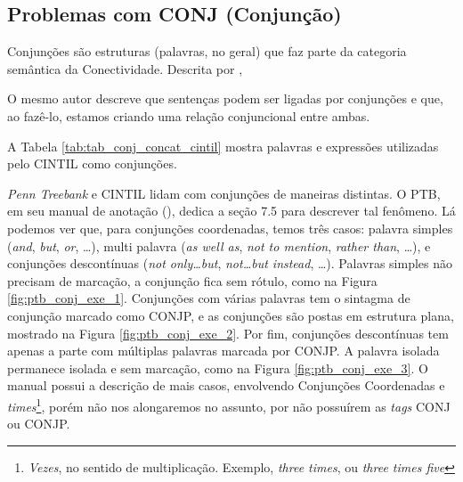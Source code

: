 \subsection{Problemas com CONJ (Conjunção)}
\label{subsec-cintil-conj}
Conjunções são estruturas (palavras, no geral) que faz parte da categoria semântica da Conectividade. Descrita por ,
\begin{displayquote}
\end{displayquote}
O mesmo autor descreve que sentenças podem ser ligadas por conjunções e que, ao fazê-lo, estamos criando uma relação conjuncional entre ambas. 
\begin{displayquote}
\end{displayquote}
A Tabela 
\ref{tab:tab_conj_concat_cintil} mostra palavras e expressões utilizadas pelo CINTIL como conjunções.
% 
\begin{center}

\end{center}
\textit{Penn Treebank} e CINTIL lidam com conjunções de maneiras distintas. O PTB, em seu manual de anotação (), dedica a seção 7.5 para descrever tal fenômeno. Lá podemos ver que, para conjunções coordenadas, temos três casos: palavra simples (\textit{and}, \textit{but}, \textit{or}, \ldots), multi palavra (\textit{as well as}, \textit{not to mention}, \textit{rather than}, \ldots), e conjunções descontínuas (\textit{not only\ldots but}, \textit{not\ldots but instead}, \ldots). Palavras simples não precisam de marcação, a conjunção fica sem rótulo, como na Figura \ref{fig:ptb_conj_exe_1}. Conjunções com várias palavras tem o sintagma de conjunção marcado como CONJP, e as conjunções são postas em estrutura plana, mostrado na Figura \ref{fig:ptb_conj_exe_2}. Por fim, conjunções descontínuas tem apenas a parte com múltiplas palavras marcada por CONJP. A palavra isolada permanece isolada e sem marcação, como na Figura \ref{fig:ptb_conj_exe_3}. O manual possui a descrição de mais casos, envolvendo Conjunções Coordenadas e \textit{times}\footnote{\textit{Vezes}, no sentido de multiplicação. Exemplo, \textit{three times}, ou \textit{three times five}}, porém não nos alongaremos no assunto, por não possuírem as \textit{tags} CONJ ou CONJP.
